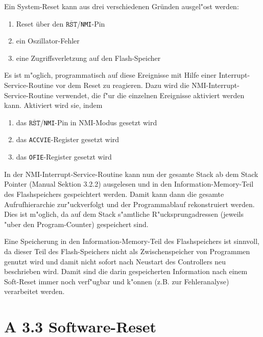 \documentclass[11pt,a4paper,ngerman]{article}
\begin{document}
\begin{description}
\begin{samepage}
Ein System-Reset kann aus drei verschiedenen Gründen ausgel"ost werden:
\begin{enumerate}
\item Reset über den $\overline{\texttt{RST}}$/\texttt{NMI}-Pin
\item ein Oszillator-Fehler
\item eine Zugriffsverletzung auf den Flash-Speicher
\end{enumerate}
\end{samepage}
\begin{samepage}
Es ist m"oglich, programmatisch auf diese Ereignisse mit Hilfe einer Interrupt-Service-Routine vor dem Reset zu reagieren. Dazu wird die NMI-Interrupt-Service-Routine verwendet, die f"ur die einzelnen Ereignisse aktiviert werden kann. Aktiviert wird sie, indem
\begin{enumerate}
\item das $\overline{\texttt{RST}}$/\texttt{NMI}-Pin in NMI-Modus gesetzt wird
\item das \texttt{ACCVIE}-Register gesetzt wird
\item das \texttt{OFIE}-Register gesetzt wird
\end{enumerate}
\end{samepage}

\newpage

In der NMI-Interrupt-Service-Routine kann nun der gesamte Stack ab dem Stack Pointer (Manual Sektion 3.2.2) ausgelesen und in den Information-Memory-Teil des Flashspeichers gespeichtert werden. Damit kann dann die gesamte Aufrufhierarchie zur"uckverfolgt und der Programmablauf rekonstruiert werden.
Dies ist m"oglich, da auf dem Stack s"amtliche R"ucksprungadressen (jeweils "uber den Program-Counter) gespeichert sind. 

Eine Speicherung in den Information-Memory-Teil des Flashspeichers ist sinnvoll, da dieser Teil des Flash-Speichers nicht als Zwischenspeicher von Programmen genutzt wird und damit nicht sofort nach Neustart des Controllers neu beschrieben wird. Damit sind die darin gespeicherten Information nach einem Soft-Reset immer noch  verf"ugbar und k"onnen (z.B. zur Fehleranalyse) verarbeitet werden.
\end{description}


\section*{A 3.3 Software-Reset} 
\end{document}
